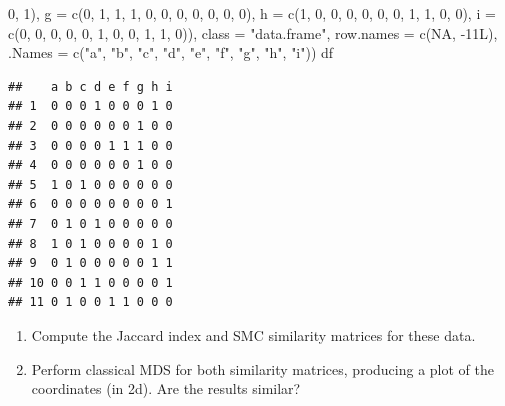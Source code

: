 \documentclass[
]{book}
\newenvironment{Shaded}{\begin{snugshade}}{\end{snugshade}}
\newcommand{\AttributeTok}[1]{\textcolor[rgb]{0.77,0.63,0.00}{#1}}
\newcommand{\ConstantTok}[1]{\textcolor[rgb]{0.00,0.00,0.00}{#1}}
\newcommand{\DecValTok}[1]{\textcolor[rgb]{0.00,0.00,0.81}{#1}}
\newcommand{\FunctionTok}[1]{\textcolor[rgb]{0.00,0.00,0.00}{#1}}
\newcommand{\NormalTok}[1]{#1}
\newcommand{\SpecialCharTok}[1]{\textcolor[rgb]{0.00,0.00,0.00}{#1}}
\newcommand{\StringTok}[1]{\textcolor[rgb]{0.31,0.60,0.02}{#1}}
\theoremstyle{definition}
\theoremstyle{definition}
\theoremstyle{definition}
\theoremstyle{definition}
\theoremstyle{remark}
\begin{document}
\begin{Shaded}
\begin{Highlighting}[]
\DecValTok{0}\NormalTok{, }\DecValTok{1}\NormalTok{), }\AttributeTok{g =} \FunctionTok{c}\NormalTok{(}\DecValTok{0}\NormalTok{, }\DecValTok{1}\NormalTok{, }\DecValTok{1}\NormalTok{, }\DecValTok{1}\NormalTok{, }\DecValTok{0}\NormalTok{, }\DecValTok{0}\NormalTok{, }\DecValTok{0}\NormalTok{, }\DecValTok{0}\NormalTok{, }\DecValTok{0}\NormalTok{, }\DecValTok{0}\NormalTok{, }\DecValTok{0}\NormalTok{), }\AttributeTok{h =} \FunctionTok{c}\NormalTok{(}\DecValTok{1}\NormalTok{, }\DecValTok{0}\NormalTok{, }\DecValTok{0}\NormalTok{, }
\DecValTok{0}\NormalTok{, }\DecValTok{0}\NormalTok{, }\DecValTok{0}\NormalTok{, }\DecValTok{0}\NormalTok{, }\DecValTok{1}\NormalTok{, }\DecValTok{1}\NormalTok{, }\DecValTok{0}\NormalTok{, }\DecValTok{0}\NormalTok{), }\AttributeTok{i =} \FunctionTok{c}\NormalTok{(}\DecValTok{0}\NormalTok{, }\DecValTok{0}\NormalTok{, }\DecValTok{0}\NormalTok{, }\DecValTok{0}\NormalTok{, }\DecValTok{0}\NormalTok{, }\DecValTok{1}\NormalTok{, }\DecValTok{0}\NormalTok{, }\DecValTok{0}\NormalTok{, }\DecValTok{1}\NormalTok{, }\DecValTok{1}\NormalTok{, }
\DecValTok{0}\NormalTok{)), }\AttributeTok{class =} \StringTok{"data.frame"}\NormalTok{, }\AttributeTok{row.names =} \FunctionTok{c}\NormalTok{(}\ConstantTok{NA}\NormalTok{, }\SpecialCharTok{{-}}\NormalTok{11L), }\AttributeTok{.Names =} \FunctionTok{c}\NormalTok{(}\StringTok{"a"}\NormalTok{, }
\StringTok{"b"}\NormalTok{, }\StringTok{"c"}\NormalTok{, }\StringTok{"d"}\NormalTok{, }\StringTok{"e"}\NormalTok{, }\StringTok{"f"}\NormalTok{, }\StringTok{"g"}\NormalTok{, }\StringTok{"h"}\NormalTok{, }\StringTok{"i"}\NormalTok{))}
\NormalTok{df}
\end{Highlighting}
\end{Shaded}

\begin{verbatim}
##    a b c d e f g h i
## 1  0 0 0 1 0 0 0 1 0
## 2  0 0 0 0 0 0 1 0 0
## 3  0 0 0 0 1 1 1 0 0
## 4  0 0 0 0 0 0 1 0 0
## 5  1 0 1 0 0 0 0 0 0
## 6  0 0 0 0 0 0 0 0 1
## 7  0 1 0 1 0 0 0 0 0
## 8  1 0 1 0 0 0 0 1 0
## 9  0 1 0 0 0 0 0 1 1
## 10 0 0 1 1 0 0 0 0 1
## 11 0 1 0 0 1 1 0 0 0
\end{verbatim}

\begin{enumerate}
\def\labelenumi{\roman{enumi}.}
\item
  Compute the Jaccard index and SMC similarity matrices for these data.
\item
  Perform classical MDS for both similarity matrices, producing a plot of the coordinates (in 2d). Are the results similar?
\end{enumerate}
\end{document}

